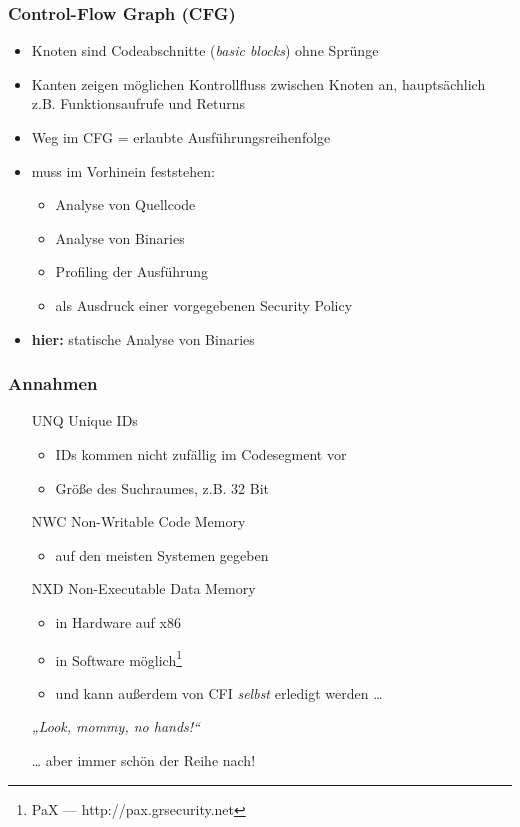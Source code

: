 \documentclass[serif,slidestop,compress,red]{beamer}
\begin{document}
\begin{frame}
  \frametitle{Control-Flow Graph (CFG)}
  \begin{itemize}
    \item Knoten sind Codeabschnitte (\emph{basic blocks}) ohne Sprünge
    \item Kanten zeigen möglichen Kontrollfluss zwischen Knoten an, hauptsächlich z.B. Funktionsaufrufe und Returns
    \item Weg im CFG = erlaubte Ausführungsreihenfolge
    \item muss im Vorhinein feststehen:
    \begin{itemize}
      \item Analyse von Quellcode
      \item Analyse von Binaries
      \item Profiling der Ausführung
      \item als Ausdruck einer vorgegebenen Security Policy
    \end{itemize}
    \item \textbf{hier:} statische Analyse von Binaries
  \end{itemize}
\end{frame}

\begin{frame}
  \frametitle{Annahmen}
  \begin{itemize}
    \item[UNQ] Unique IDs
    \begin{itemize}
      \item IDs kommen nicht zufällig im Codesegment vor
      \item Größe des Suchraumes, z.B. 32 Bit
    \end{itemize}
    \item[NWC] Non-Writable Code Memory
    \begin{itemize}
      \item auf den meisten Systemen gegeben
    \end{itemize}
    \item[NXD] Non-Executable Data Memory
    \begin{itemize}
      \item in Hardware auf x86
      \item in Software möglich\footnote{PaX — http://pax.grsecurity.net}
      \item und kann außerdem von CFI \emph{selbst} erledigt werden …
    \end{itemize}
    \begin{flushright}
      \emph{„Look, mommy, no hands!“}
    \end{flushright}
    … aber immer schön der Reihe nach!
  \end{itemize}
\end{frame}
\end{document}
